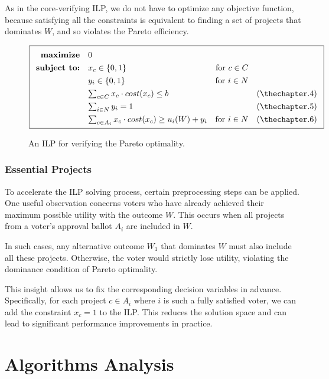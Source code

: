 \documentclass[magisterska,en]{pracamgr}
\begin{document}
As in the core-verifying ILP, we do not have to optimize any objective function, because satisfying all the constraints is equivalent to finding a set of projects that dominates $W$, and so violates the Pareto efficiency.

\begin{figure}[h!]
$$
\boxed{
\renewcommand{\arraystretch}{1.3}
\begin{array}{rlrr}
\textbf{maximize}    & 0 & \\
\textbf{subject to:} & x_c\in\{0,1\} & \mbox{for } c\in C & \\
                     & y_i\in\{0,1\} & \mbox{for } i\in N & \\
                     & \sum_{c\in C}x_c\cdot cost(x_c)\leq b & & \text{(\thechapter.4)} \\
                     & \sum_{i\in N}y_i=1 & & \text{(\thechapter.5)} \\
                     & \sum_{c\in A_i}x_c\cdot cost(x_c)\geq u_i(W)+y_i & \mbox{for } i\in N & \text{(\thechapter.6)}
\end{array}
}
$$
\caption{An ILP for verifying the Pareto optimality.}
\label{pareto-ILP}
\end{figure}

\subsection{Essential Projects}

To accelerate the ILP solving process, certain preprocessing steps can be applied. One useful observation concerns voters who have already achieved their maximum possible utility with the outcome $W$. This occurs when all projects from a voter's approval ballot $A_i$ are included in $W$.

In such cases, any alternative outcome $W_1$ that dominates $W$ must also include all these projects. Otherwise, the voter would strictly lose utility, violating the dominance condition of Pareto optimality.

This insight allows us to fix the corresponding decision variables in advance. Specifically, for each project $c\in A_i$ where $i$ is such a fully satisfied voter, we can add the constraint $x_c=1$ to the ILP. This reduces the solution space and can lead to significant performance improvements in practice.

\chapter{Algorithms Analysis}
\label{algorithms-analysis}
\end{document}
